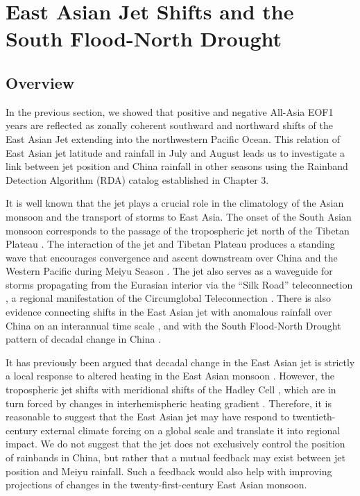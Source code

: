 \section{East Asian Jet Shifts and the South Flood-North Drought}

\subsection{Overview}

	In the previous section, we showed that positive and negative All-Asia EOF1 years are reflected as zonally coherent southward and northward shifts of the East Asian Jet extending into the northwestern Pacific Ocean. This relation of East Asian jet latitude and rainfall in July and August leads us to investigate a link between jet position and China rainfall in other seasons using the Rainband Detection Algorithm (RDA) catalog established in Chapter 3. 
	
	It is well known that the jet plays a crucial role in the climatology of the Asian monsoon and the transport of storms to East Asia. The onset of the South Asian monsoon corresponds to the passage of the tropospheric jet north of the Tibetan Plateau \citep{Yin1949,Yeh1959,Hahn1975}. The interaction of the jet and Tibetan Plateau produces a standing wave that encourages convergence and ascent downstream over China and the Western Pacific during Meiyu Season \citep{Yang2002,Molnar2010,Chen2015}. The jet also serves as a waveguide for storms propagating from the Eurasian interior via the ``Silk Road'' teleconnection \citep{Kosaka2012}, a regional manifestation of the Circumglobal Teleconnection \citep{Hoskins1993,Ambrizzi1997,Park1997}. There is also evidence connecting shifts in the East Asian jet with anomalous rainfall over China on an interannual time scale \citep{Liang1998,Du2009,Li2014}, and with the South Flood-North Drought pattern of decadal change in China \citep{Yu2004,Yu2007}. 
	
	It has previously been argued that decadal change in the East Asian jet is strictly a local response to altered heating in the East Asian monsoon \citep{Yu2007}. However, the tropospheric jet shifts with meridional shifts of the Hadley Cell \citep{Kang2011a}, which are in turn forced by changes in interhemispheric heating gradient \citep{Chiang2012,Donohoe2013,Schneider2014}. Therefore, it is reasonable to suggest that the East Asian jet may have respond to twentieth-century external climate forcing on a global scale and translate it into regional impact. We do not suggest that the jet does not exclusively control the position of rainbands in China, but rather that a mutual feedback may exist between jet position and Meiyu rainfall. Such a feedback would also help with improving projections of changes in the twenty-first-century East Asian monsoon.
	
